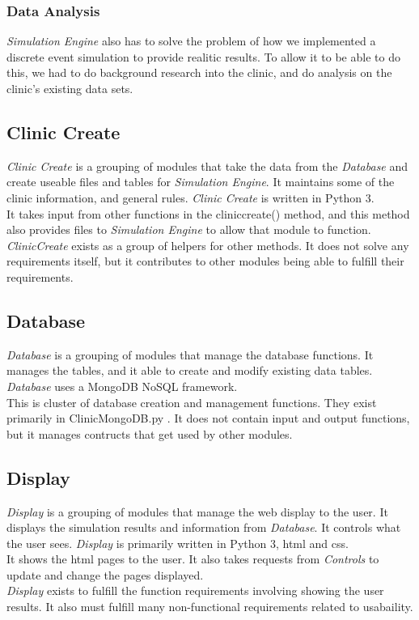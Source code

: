 \documentclass[12pt]{article}
\begin{document}
\subsubsection{Data Analysis}
\textit{Simulation Engine} also has to solve the problem of how we implemented a discrete event simulation to provide realitic results. 
To allow it to be able to do this, we had to do background research into the clinic, and do analysis on the clinic's existing data sets. \\

\subsection{Clinic Create}
\textit{Clinic Create} is a grouping of modules that take the data from the \textit{Database} and create useable files and tables for \textit{Simulation Engine}. It maintains some of the clinic information, and general rules. \textit{Clinic Create} is written in Python 3.\\
It takes input from other functions in the cliniccreate() method, and this method also provides files to \textit{Simulation Engine} to allow that module to function. \\
\textit{ClinicCreate} exists as a group of helpers for other methods. It does not solve any requirements itself, but it contributes to other modules being able to fulfill their requirements. \\
\subsection{Database}
\textit{Database} is a grouping of modules that manage the database functions. It manages the tables, and it able to create and modify existing data tables. \textit{Database} uses a  MongoDB NoSQL framework. \\
This is cluster of database creation and management functions. They exist primarily in ClinicMongoDB.py . It does not contain input and output functions, but it manages contructs that get used by other modules. \\
\subsection{Display}
\textit{Display} is a grouping of modules that manage the web display to the user. It displays the simulation results and information from \textit{Database}. It controls what the user sees. \textit{Display} is primarily written in Python 3, html and css. \\
It shows the html pages to the user. It also takes requests from \textit{Controls} to update and change the pages displayed. \\
\textit{Display} exists to fulfill the function requirements involving showing the user results. It also must fulfill many non-functional requirements related to usabaility. \\
\end{document}
